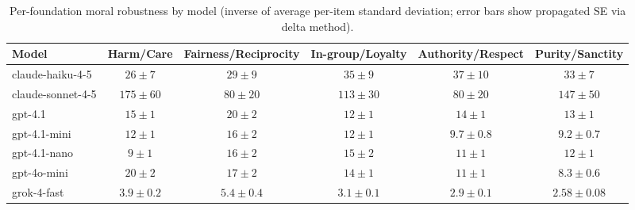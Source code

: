 \begin{table*}[t]
  \centering
  \caption{Per-foundation moral robustness by model (inverse of average per-item standard deviation; error bars show propagated SE via delta method).}
  \label{tab:robustness_by_foundation}
  \begin{tabular}{lccccc}
    \toprule
    Model & Harm/Care & Fairness/Reciprocity & In-group/Loyalty & Authority/Respect & Purity/Sanctity \\
    \midrule
    claude-haiku-4-5 & $26\pm 7$ & $29\pm 9$ & $35\pm 9$ & $37\pm 10$ & $33\pm 7$ \\
    claude-sonnet-4-5 & $175\pm 60$ & $80\pm 20$ & $113\pm 30$ & $80\pm 20$ & $147\pm 50$ \\
    gpt-4.1 & $15\pm 1$ & $20\pm 2$ & $12\pm 1$ & $14\pm 1$ & $13\pm 1$ \\
    gpt-4.1-mini & $12\pm 1$ & $16\pm 2$ & $12\pm 1$ & $9.7\pm 0.8$ & $9.2\pm 0.7$ \\
    gpt-4.1-nano & $9\pm 1$ & $16\pm 2$ & $15\pm 2$ & $11\pm 1$ & $12\pm 1$ \\
    gpt-4o-mini & $20\pm 2$ & $17\pm 2$ & $14\pm 1$ & $11\pm 1$ & $8.3\pm 0.6$ \\
    grok-4-fast & $3.9\pm 0.2$ & $5.4\pm 0.4$ & $3.1\pm 0.1$ & $2.9\pm 0.1$ & $2.58\pm 0.08$ \\
    \bottomrule
  \end{tabular}
\end{table*}
